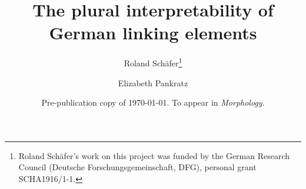\usepackage{natbib}


\usepackage[margin=4cm]{geometry}

\usepackage{authblk}
\author[1]{Roland Schäfer\thanks{Roland Schäfer's work on this project was funded by the German Research Council (Deutsche Forschungsgemeinschaft, DFG), personal grant SCHA1916/1-1.}}
\author[2]{Elizabeth Pankratz}

\title{The plural interpretability of German linking elements}
\date{Pre-publication copy of \today. To appear in \textit{Morphology}.}

\newenvironment{acknowledgements}{\section*{Acknowledgements}}{}
\newenvironment{ethicalstandards}{\section*{Compliance with ethical standards}}{}
\newcommand{\keywords}[1]{\newline\vspace{\baselineskip}\newline\noindent \textbf{Keywords: #1}}

\newcommand{\TheDOI}{\url{https://doi.org/10.5281/zenodo.1323211}}
\newcommand{\TheUniversity}{Freie Universität Berlin}
